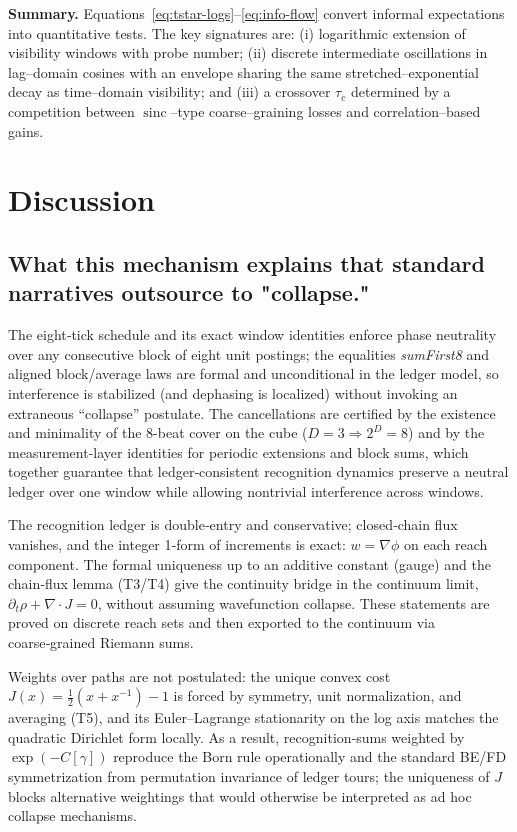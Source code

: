 \documentclass[12pt,a4paper]{article}
\theoremstyle{definition}
\theoremstyle{remark}
\begin{document}
\medskip
\noindent\textbf{Summary.}
Equations~\eqref{eq:tstar-logs}--\eqref{eq:info-flow} convert informal expectations into quantitative tests. The key signatures are: (i) logarithmic extension of visibility windows with probe number; (ii) discrete intermediate oscillations in lag--domain cosines with an envelope sharing the same stretched--exponential decay as time--domain visibility; and (iii) a crossover \(\tau_{\mathrm{c}}\) determined by a competition between \(\operatorname{sinc}\)--type coarse--graining losses and correlation--based gains.

\section{Discussion}

\subsection{What this mechanism explains that standard narratives outsource to "collapse."}
The eight‑tick schedule and its exact window identities enforce phase neutrality over any consecutive block of eight unit postings; the equalities \emph{sumFirst8} and aligned block/average laws are formal and unconditional in the ledger model, so interference is stabilized (and dephasing is localized) without invoking an extraneous ``collapse'' postulate. The cancellations are certified by the existence and minimality of the \(8\)-beat cover on the cube (\(D=3\Rightarrow 2^D=8\)) and by the measurement‑layer identities for periodic extensions and block sums, which together guarantee that ledger‑consistent recognition dynamics preserve a neutral ledger over one window while allowing nontrivial interference across windows.

The recognition ledger is double‑entry and conservative; closed‑chain flux vanishes, and the integer 1‑form of increments is exact: \(w=\nabla\phi\) on each reach component. The formal uniqueness up to an additive constant (gauge) and the chain‑flux lemma (T3/T4) give the continuity bridge in the continuum limit, \(\partial_t\rho+\nabla\cdot J=0\), without assuming wavefunction collapse. These statements are proved on discrete reach sets and then exported to the continuum via coarse‑grained Riemann sums.

Weights over paths are not postulated: the unique convex cost \(J(x)=\tfrac12(x+x^{-1})-1\) is forced by symmetry, unit normalization, and averaging (T5), and its Euler–Lagrange stationarity on the log axis matches the quadratic Dirichlet form locally. As a result, recognition‑sums weighted by \(\exp(-C[\gamma])\) reproduce the Born rule operationally and the standard BE/FD symmetrization from permutation invariance of ledger tours; the uniqueness of \(J\) blocks alternative weightings that would otherwise be interpreted as ad hoc collapse mechanisms.
\end{document}
